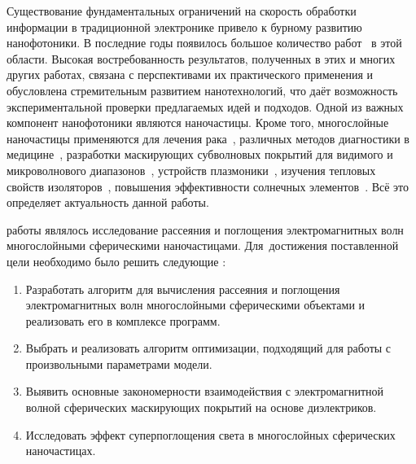 {\actuality} Существование фундаментальных ограничений на скорость
обработки информации в традиционной электронике привело к бурному
развитию нанофотоники. В последние годы появилось большое количество
работ~\cite{Tame-quantum-plasmonics-2013,
  Javier-graphene-plasmonics-2014, Khurgin-loss-plasmonics-2015,
  He-tunable-terahertz-graphene-metamaterials-2015,
  Segal-meta-nonlinar-PhC-2015,
  Poddubny-hyperbolic-metamaterials-2013, Kildishev-metasurface-2013}
в этой области.  Высокая востребованность результатов, полученных в
этих и многих других работах, связана с перспективами их практического
применения и обусловлена стремительным развитием нанотехнологий, что
даёт возможность экспериментальной проверки предлагаемых идей и
подходов. Одной из важных компонент нанофотоники являются наночастицы.
Кроме того, многослойные наночастицы применяются для лечения
рака~\cite{Zhang-2010, Hirsch-2003}, различных методов диагностики в
медицине~\cite{Allain-2002}, разработки маскирующих субволновых
покрытий для видимого и микроволнового диапазонов~\cite{Qui-2009,
  Semouchkina-2013}, устройств плазмоники~\cite{Martin-2013,
  Alu-2005}, изучения тепловых свойств изоляторов~\cite{Xie-2013},
повышения эффективности солнечных элементов~\cite{Kameya-2011,
  Mann-2011}.  Всё это определяет актуальность данной работы.

{\aim} работы являлось %
исследование рассеяния и поглощения электромагнитных волн многослойными
сферическими наночастицами.
Для~достижения поставленной цели необходимо было решить следующие {\tasks}:
\begin{enumerate}
  \item Разработать алгоритм для вычисления рассеяния и поглощения
    электромагнитных волн
    многослойными сферическими объектами и реализовать его в комплексе программ.
  \item Выбрать и реализовать алгоритм оптимизации, подходящий для
    работы с произвольными параметрами модели.%
  \item Выявить основные закономерности взаимодействия с
    электромагнитной волной сферических маскирующих покрытий на
    основе диэлектриков.
  \item Исследовать эффект суперпоглощения света в многослойных
    сферических наночастицах.
\end{enumerate}

